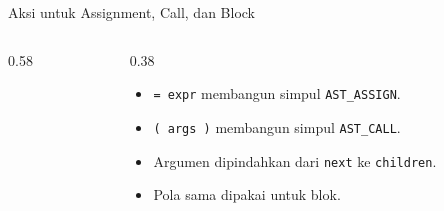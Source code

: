 \documentclass[aspectratio=169,10pt,t]{beamer}
\begin{document}
\begin{frame}[fragile]{Aksi untuk Assignment, Call, dan Block}
  \begin{columns}[T,onlytextwidth]
    \begin{column}{0.58\textwidth}
      
    \end{column}
    \begin{column}{0.38\textwidth}
      \begin{itemize}
        \item \texttt{= expr} membangun simpul
              \texttt{AST\_ASSIGN}.
        \item \texttt{( args )} membangun simpul
              \texttt{AST\_CALL}.
        \item Argumen dipindahkan dari \texttt{next} ke
              \texttt{children}.
        \item Pola sama dipakai untuk blok.
      \end{itemize}
    \end{column}
  \end{columns}
\end{frame}
\end{document}
